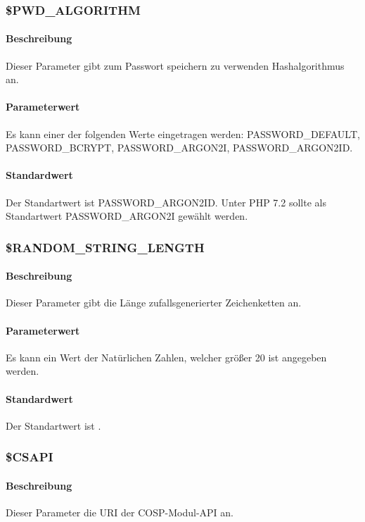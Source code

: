 \subsubsection{\$PWD\_ALGORITHM}
\paragraph{Beschreibung}Dieser Parameter gibt zum Passwort speichern zu verwenden Hashalgorithmus an. 
\paragraph{Parameterwert}Es kann einer der folgenden Werte eingetragen werden: {\glqq PASSWORD\_DEFAULT\grqq}, {\glqq PASSWORD\_BCRYPT\grqq}, {\glqq PASSWORD\_ARGON2I\grqq}, {\glqq PASSWORD\_ARGON2ID\grqq}.
\paragraph{Standardwert}Der Standartwert ist {\glqq PASSWORD\_ARGON2ID\grqq}. Unter PHP 7.2 sollte als Standartwert {\glqq PASSWORD\_ARGON2I\grqq} gewählt werden.

\subsubsection{\$RANDOM\_STRING\_LENGTH}
\paragraph{Beschreibung}Dieser Parameter gibt die Länge zufallsgenerierter Zeichenketten an.
\paragraph{Parameterwert}Es kann ein Wert der Natürlichen Zahlen, welcher größer 20 ist angegeben werden.
\paragraph{Standardwert}Der Standartwert ist {\grqq}.

\subsubsection{\$CSAPI}
\paragraph{Beschreibung}Dieser Parameter die URI der {\glqq COSP\grqq}-Modul-API an.
